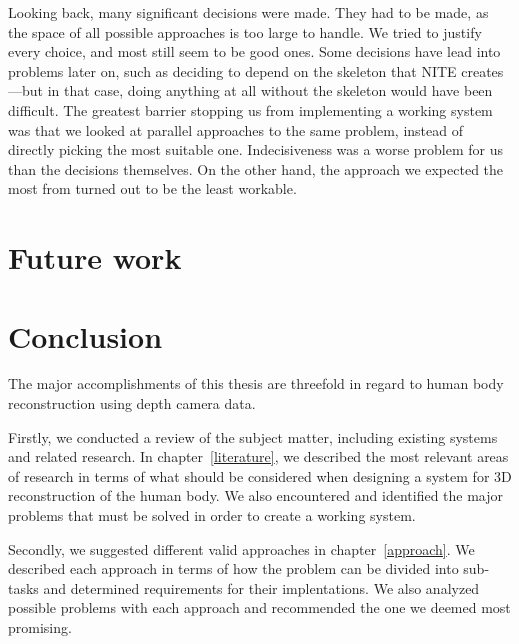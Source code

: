 Looking back, many significant decisions were made. They had to be made, as the space of all possible approaches is too large to handle. We tried to justify every choice, and most still seem to be good ones. Some decisions have lead into problems later on, such as deciding to depend on the skeleton that NITE creates---but in that case, doing anything at all without the skeleton would have been difficult. The greatest barrier stopping us from implementing a working system was that we looked at parallel approaches to the same problem, instead of directly picking the most suitable one. Indecisiveness was a worse problem for us than the decisions themselves. On the other hand, the approach we expected the most from turned out to be the least workable.

\section{Future work}


\section{Conclusion}

The major accomplishments of this thesis are threefold in regard to human body reconstruction using depth camera data.

Firstly, we conducted a review of the subject matter, including existing systems and related research. In chapter~\ref{literature}, we described the most relevant areas of research in terms of what should be considered when designing a system for 3D reconstruction of the human body. We also encountered and identified the major problems that must be solved in order to create a working system.

Secondly, we suggested different valid approaches in chapter~\ref{approach}. We described each approach in terms of how the problem can be divided into sub-tasks and determined requirements for their implentations. We also analyzed possible problems with each approach and recommended the one we deemed most promising.

